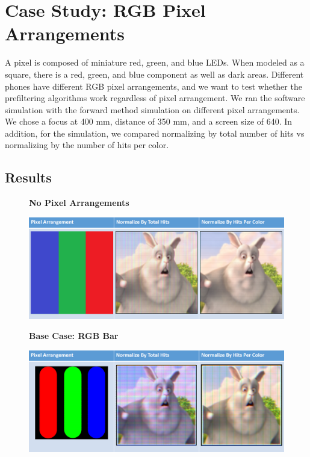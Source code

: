 \chapter{Case Study: RGB Pixel Arrangements}

A pixel is composed of miniature red, green, and blue LEDs. When modeled as a square, there is a red, green, and blue component as well as dark areas. Different phones have different RGB pixel arrangements, and we want to test whether the prefiltering algorithms work regardless of pixel arrangement. We ran the software simulation with the forward method simulation on different pixel arrangements. We chose a focus at 400 mm, distance of 350 mm, and a screen size of 640. In addition, for the simulation, we compared normalizing by total number of hits vs normalizing by the number of hits per color.

\section{Results}

\begin{figure}
    \centering
    \textbf{No Pixel Arrangements}\par\medskip
    \includegraphics[width=6in]{chapters/chapter7/images/No_Pixel_Arrangement.png}
\end{figure}

\begin{figure}
    \centering
    \textbf{Base Case: RGB Bar}\par\medskip
    \includegraphics[width=6in]{chapters/chapter7/images/RGB_Bar.png}
\end{figure}


